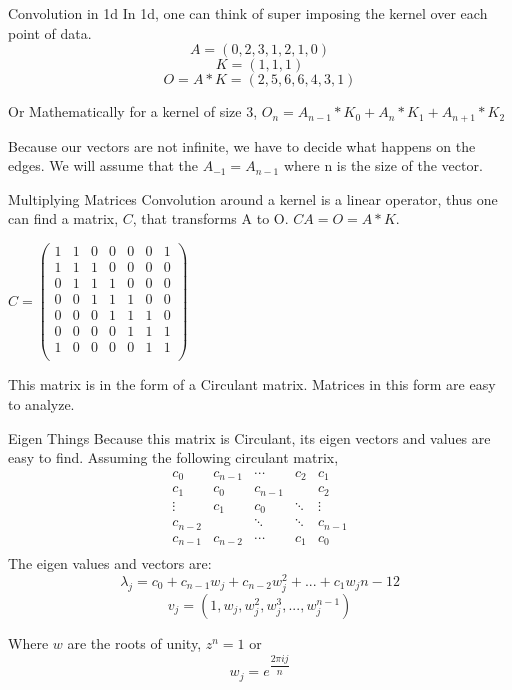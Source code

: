 \documentclass{beamer}
\begin{document}
\begin{frame} {Convolution in 1d}
In 1d, one can think of super imposing the kernel over each point of data.
$$A = (0,2,3,1,2,1,0)$$
$$K = (1,1,1)$$ 
$$O = A*K = (2,5,6,6,4,3,1)$$

Or Mathematically for a kernel of size 3, $O_n = A_{n-1}*K_{0}+A_{n}*K_{1}+A_{n+1}*K_{2}$

Because our vectors are not infinite, we have to decide what happens on the edges. We will assume that the $A_{-1} = A_{n-1}$ where n is the size of the vector.
\end{frame}


\begin{frame}{Multiplying Matrices}
Convolution around a kernel is a linear operator, thus one can find a matrix, $C$, that transforms A to O. $CA=O=A*K$.

$C = \begin{pmatrix}
	1 & 1 & 0 & 0 & 0 & 0 & 1\\
	1 & 1 & 1 & 0 & 0 & 0 & 0\\
	0 & 1 & 1 & 1 & 0 & 0 & 0\\
	0 & 0 & 1 & 1 & 1 & 0 & 0\\
	0 & 0 & 0 & 1 & 1 & 1 & 0\\
	0 & 0 & 0 & 0 & 1 & 1 & 1\\
	1 & 0 & 0 & 0 & 0 & 1 & 1\\
\end{pmatrix}$

This matrix is in the form of a Circulant matrix. Matrices in this form are easy to analyze.

\end{frame}


\begin{frame}{Eigen Things}
Because this matrix is Circulant, its eigen vectors and values are easy to find. 
Assuming the following circulant matrix, 
$$\begin{matrix}
	c_0 & c_{n-1} & \cdots & c_2 & c_1\\
	c_1 & c_0 & c_{n-1} &  & c_2\\
	\vdots & c_1 & c_0 & \ddots & \vdots\\
	c_{n-2} &   & \ddots & \ddots & c_{n-1}\\
	c_{n-1} & c_{n-2} & \cdots & c_1 & c_0\\
\end{matrix}$$
The eigen values and vectors are:
$$\lambda_j =c_0+c_{n-1}w_j	+c_{n-2}w_j^2+...+c_{1}w_j{n-1}2$$
$$v_j = (1, w_j, w_j^2, w_j^3, ..., w_j^{n-1})$$

Where $w$ are the roots of unity, $z^n = 1$ or 
$$w_j = e^{\dfrac{2\pi i j}{n}}$$

\end{frame}
\end{document}
